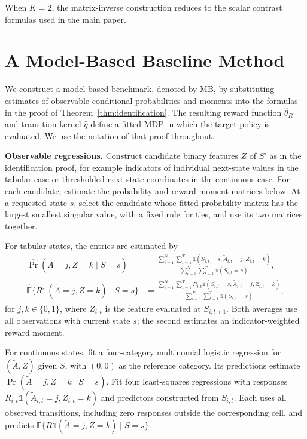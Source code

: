 \documentclass[12pt]{article}
\newcommand{\0}{\boldsymbol{0}}
\newcommand{\E}{\mathbb{E}}
\begin{document}
When \(K=2\), the matrix-inverse construction reduces to the scalar
contrast formulas used in the main paper.


\section{A Model-Based Baseline Method} \label{sec:model-based}

We construct a model-based benchmark, denoted by MB, by substituting estimates of observable conditional probabilities and moments into the formulas in the proof of Theorem~\ref{thm:identification}. The resulting reward function $\widehat\theta_R$ and transition kernel $\widehat q$ define a fitted MDP in which the target policy is evaluated. We use the notation of that proof throughout.

\textbf{Observable regressions.}
Construct candidate binary features $Z$ of $S'$ as in the identification proof, for example indicators of individual next-state values in the tabular case or thresholded next-state coordinates in the continuous case. For each candidate, estimate the probability and reward moment matrices below. At a requested state $s$, select the candidate whose fitted probability matrix has the largest smallest singular value, with a fixed rule for ties, and use its two matrices together.

For tabular states, the entries are estimated by
\begin{align*}
\widehat{\Pr}(\widetilde A=j,Z=k\mid S=s)
&=\frac{\sum_{i=1}^N\sum_{t=1}^T
\mathds{1}(S_{i,t}=s,\widetilde A_{i,t}=j,Z_{i,t}=k)}
{\sum_{i=1}^N\sum_{t=1}^T\mathds{1}(S_{i,t}=s)},\\
\widehat{\E}\{R\mathds{1}(\widetilde A=j,Z=k)\mid S=s\}
&=\frac{\sum_{i=1}^N\sum_{t=1}^T
R_{i,t}\mathds{1}(S_{i,t}=s,\widetilde A_{i,t}=j,Z_{i,t}=k)}
{\sum_{i=1}^N\sum_{t=1}^T\mathds{1}(S_{i,t}=s)},
\end{align*}
for $j,k\in\{0,1\}$, where $Z_{i,t}$ is the feature evaluated at $S_{i,t+1}$. Both averages use all observations with current state $s$; the second estimates an indicator-weighted reward moment.

For continuous states, fit a four-category multinomial logistic regression for $(\widetilde A,Z)$ given $S$, with $(0,0)$ as the reference category. Its predictions estimate $\Pr(\widetilde A=j,Z=k\mid S=s)$. Fit four least-squares regressions with responses $R_{i,t}\mathds{1}(\widetilde A_{i,t}=j,Z_{i,t}=k)$ and predictors constructed from $S_{i,t}$. Each uses all observed transitions, including zero responses outside the corresponding cell, and predicts $\E\{R\mathds{1}(\widetilde A=j,Z=k)\mid S=s\}$.
\end{document}
